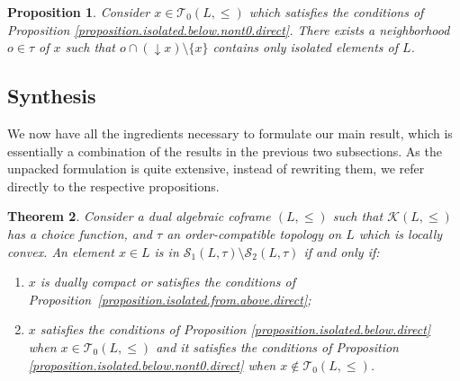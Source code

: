 \documentclass{article}
\newcommand{\blue}{\color{blue}}
\newtheorem{theorem}{Theorem}[section]
\newtheorem{proposition}[theorem]{Proposition}
\begin{document}
\begin{proposition}\label{proposition.reverse.last}
    Consider $x \in \mathcal{T}_0(L,\le)$ 
    which satisfies the conditions of Proposition \ref{proposition.isolated.below.nont0.direct}. There exists a neighborhood $o \in \tau$ of $x$ such that 
    $o \cap (\mathop{\downarrow}x) \setminus \{x\}$ contains only isolated elements of $L$. 
\end{proposition}


\subsection{{Synthesis}}

{
We now have all the ingredients necessary to 
formulate our main result, which is essentially a combination of the results in the previous two subsections.} As the unpacked formulation is quite extensive, instead of rewriting them, we refer directly to the respective propositions. 



\begin{theorem}
Consider a dual algebraic coframe $(L,\le)$ such that $\mathcal{K}(L,\le)$ has a choice function, and $\tau$ an order-compatible topology on $L$ which is locally convex. 
An element \(x\in L\) is in \(\mathcal{S}_1(L,\tau)\setminus \mathcal{S}_2(L,\tau)\) if and only if: 
\begin{enumerate}
\item[(i)] $x$ is dually compact or satisfies the conditions of Proposition~\ref{proposition.isolated.from.above.direct}; 
\item[(ii)] $x$ satisfies the conditions of Proposition \ref{proposition.isolated.below.direct}
when $x \in \mathcal{T}_0(L,\le)$ and it satisfies the conditions of Proposition \ref{proposition.isolated.below.nont0.direct} when $x \notin \mathcal{T}_0(L,\le)$.
\end{enumerate}
\end{theorem}
\end{document}
